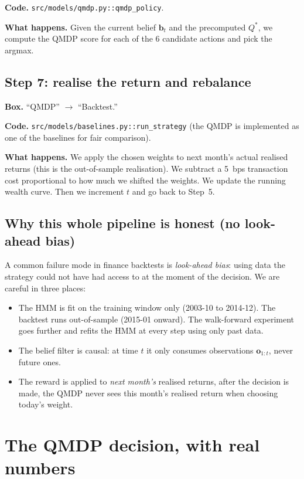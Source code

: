 \documentclass[11pt]{article}
\newcommand{\bel}{\mathbf{b}}
\begin{document}
\textbf{Code.} \texttt{src/models/qmdp.py::qmdp\_policy}.

\textbf{What happens.} Given the current belief $\bel_t$ and the precomputed $Q^*$, we compute the QMDP score for each of the 6 candidate actions and pick the argmax.

\subsection{Step 7: realise the return and rebalance}

\textbf{Box.} ``QMDP'' $\to$ ``Backtest.''

\textbf{Code.} \texttt{src/models/baselines.py::run\_strategy} (the QMDP is implemented as one of the baselines for fair comparison).

\textbf{What happens.} We apply the chosen weights to next month's actual realised returns (this is the out-of-sample realisation). We subtract a 5~bps transaction cost proportional to how much we shifted the weights. We update the running wealth curve. Then we increment $t$ and go back to Step~5.

\subsection{Why this whole pipeline is honest (no look-ahead bias)}

A common failure mode in finance backtests is \emph{look-ahead bias}: using data the strategy could not have had access to at the moment of the decision. We are careful in three places:

\begin{itemize}
  \item The HMM is fit on the training window only (2003-10 to 2014-12). The backtest runs out-of-sample (2015-01 onward). The walk-forward experiment goes further and refits the HMM at every step using only past data.
  \item The belief filter is causal: at time $t$ it only consumes observations $\mathbf{o}_{1:t}$, never future ones.
  \item The reward is applied to \emph{next month's} realised returns, after the decision is made, the QMDP never sees this month's realised return when choosing today's weight.
\end{itemize}

\section{The QMDP decision, with real numbers}
\end{document}
